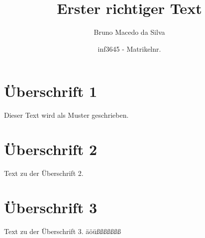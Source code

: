 \documentclass[pdftex, a4paper]{scrartcl}
\title{Erster richtiger Text}
\author{Bruno Macedo da Silva}
\author{inf3645 - Matrikelnr.}
\begin{document}
    \maketitle
    
    \tableofcontents

    \section{Überschrift 1}

    Dieser Text wird als Muster geschrieben.

    \section{Überschrift 2}

    Text zu der Überschrift 2.

    \section{Überschrift 3}

    Text zu der Überschrift 3.
    äöüßßßßßßß
    
\end{document}
